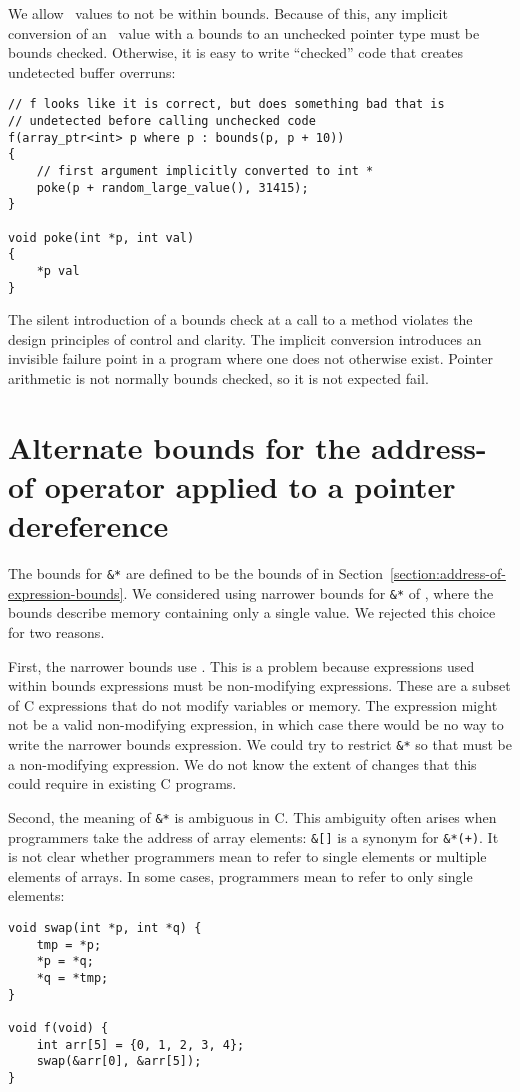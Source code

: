 We allow \arrayptr\ values to not be within bounds. Because of
this, any implicit conversion of an \arrayptr\ value with a
bounds to an unchecked pointer type must be bounds checked. Otherwise, it
is easy to write ``checked'' code that creates undetected buffer overruns:

\begin{lstlisting}
// f looks like it is correct, but does something bad that is
// undetected before calling unchecked code
f(array_ptr<int> p where p : bounds(p, p + 10))
{
    // first argument implicitly converted to int *
    poke(p + random_large_value(), 31415);  
}

void poke(int *p, int val)
{
    *p val
}
\end{lstlisting}

The silent introduction of a bounds check at a call to a method violates
the design principles of control and clarity. The implicit conversion
introduces an invisible failure point in a program where one does not
otherwise exist. Pointer arithmetic is not normally bounds checked, so
it is not expected fail.

\section{Alternate bounds for the address-of operator applied to a pointer dereference}
\label{section:alternate-address-of-pointer-bounds}

The bounds for \lstinline|&*| are defined to be the bounds of  in 
Section~\ref{section:address-of-expression-bounds}.  We considered
using narrower bounds for \lstinline|&*| of ,
where the bounds describe memory containing only a single value.
We rejected this choice for two reasons.

First, the narrower bounds use .  This is a problem because expressions used within
bounds expressions must be non-modifying expressions. These are a subset of C expressions that do 
not modify variables or memory.  The expression  might not be a valid non-modifying 
expression, in which case there would be no way to write the narrower bounds expression.  We could try to restrict \lstinline|&*| so that  must be a non-modifying expression.  We do not know
the extent of changes that this could require in existing C programs.

Second, the meaning of \lstinline|&*| is ambiguous in C.   This ambiguity often
arises when programmers take the address of array elements: \lstinline|&|\lstinline|[|\lstinline|]|
is a synonym for \lstinline|&*|\lstinline|(|\lstinline|+|\lstinline|)|.  It is not clear whether
programmers mean to refer to single elements or multiple elements of arrays.
In some cases, programmers mean
to refer to only single elements:
\begin{lstlisting}
void swap(int *p, int *q) {
    tmp = *p;
    *p = *q;
    *q = *tmp;
}

void f(void) {
    int arr[5] = {0, 1, 2, 3, 4};
    swap(&arr[0], &arr[5]);
}
\end{lstlisting}

